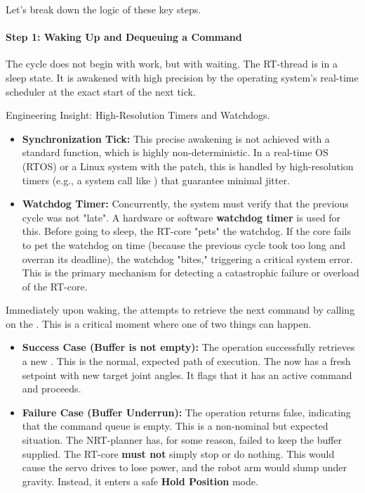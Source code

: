 Let's break down the logic of these key steps.

\paragraph{Step 1: Waking Up and Dequeuing a Command}
The cycle does not begin with work, but with waiting. The RT-thread is in a sleep state. It is awakened with high precision by the operating system's real-time scheduler at the exact start of the next tick.

\begin{tipbox}{Engineering Insight: High-Resolution Timers and Watchdogs.}
    \begin{itemize}
        \item \textbf{Synchronization Tick:} This precise awakening is not achieved with a standard  function, which is highly non-deterministic. In a real-time OS (RTOS) or a Linux system with the  patch, this is handled by high-resolution timers (e.g., a system call like ) that guarantee minimal jitter.
        \item \textbf{Watchdog Timer:} Concurrently, the system must verify that the previous cycle was not "late". A hardware or software \textbf{watchdog timer} is used for this. Before going to sleep, the RT-core "pets" the watchdog. If the core fails to pet the watchdog on time (because the previous cycle took too long and overran its deadline), the watchdog "bites," triggering a critical system error. This is the primary mechanism for detecting a catastrophic failure or overload of the RT-core.
    \end{itemize}
\end{tipbox}

Immediately upon waking, the  attempts to retrieve the next command by calling  on the . This is a critical moment where one of two things can happen.


\begin{itemize}
    \item \textbf{Success Case (Buffer is not empty):} The  operation successfully retrieves a new . This is the normal, expected path of execution. The  now has a fresh setpoint with new target joint angles. It flags that it has an active command and proceeds.
    
    \item \textbf{Failure Case (Buffer Underrun):} The  operation returns false, indicating that the command queue is empty. This is a non-nominal but expected situation. The NRT-planner has, for some reason, failed to keep the buffer supplied. The RT-core \textbf{must not} simply stop or do nothing. This would cause the servo drives to lose power, and the robot arm would slump under gravity. Instead, it enters a safe \textbf{Hold Position} mode.
\end{itemize}

